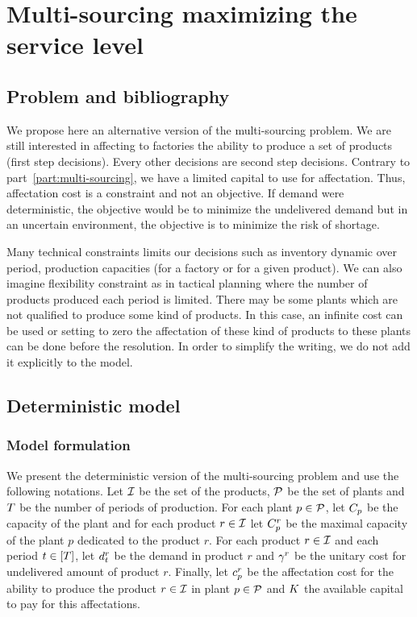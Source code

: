 \chapter{Multi-sourcing maximizing the service level}


\section{Problem and bibliography}


We propose here an alternative version of the multi-sourcing problem. We are still interested in affecting to factories the ability to produce a set of products (first step decisions). Every other decisions are second step decisions. Contrary to part~\ref{part:multi-sourcing}, we have a limited capital to use for affectation. Thus, affectation cost is a constraint and not an objective. If demand were deterministic, the objective would be to minimize the undelivered demand but in an uncertain environment, the objective is to minimize the risk of shortage.

Many technical constraints limits our decisions such as inventory dynamic over period, production capacities (for a factory or for a given product). We can also imagine flexibility constraint as in tactical planning where the number of products produced each period is limited. There may be some plants which are not qualified to produce some kind of products. In this case, an infinite cost can be used or setting to zero the affectation of these kind of products to these plants can be done before the resolution. In order to simplify the writing, we do not add it explicitly to the model.





\section{Deterministic model}

\subsection{Model formulation}

We present the deterministic version of the multi-sourcing problem and use the following notations. Let $\mathcal{I}$ be the set of the products, $\mathcal{P}$ be the set of plants and $T$ be the number of periods of production. For each plant $p\in\mathcal{P}$, let $C_p$ be the capacity of the plant and for each product $r\in\mathcal{I}$ let $C_p^r$ be the maximal capacity of the plant $p$ dedicated to the product $r$. For each product $r\in\mathcal{I}$ and each period $t\in\range{\horizon}$, let $d_t^r$ be the demand in product $r$ and $\gamma^r$ be the unitary cost for undelivered amount of product $r$. Finally, let $c_p^r$ be the affectation cost for the ability to produce the product $r\in\mathcal{I}$ in plant $p\in\mathcal{P}$ and $K$ the available capital to pay for this affectations.

